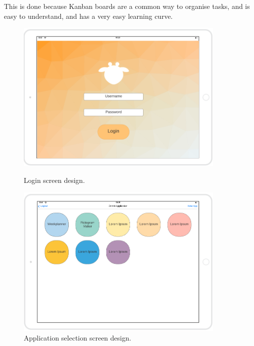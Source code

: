 This is done because Kanban boards are a common way to organise tasks, and is easy to understand, and has a very easy learning curve. \cite{kanbanBoard}

\begin{figure}[H]
    \centering
    \begin{minipage}{0.45\textwidth}
        \centering
        \includegraphics[width=0.9\textwidth]{Sprint_1/images/login_screen.png}
        \caption{Login screen design.}
        \label{login_screen_design}
    \end{minipage}\hfill
    \begin{minipage}{0.45\textwidth}
        \centering
        \includegraphics[width=0.9\textwidth]{Sprint_1/images/app_selection_screen.png}
        \caption{Application selection screen design.}
        \label{app_selection_screen}
    \end{minipage}
\end{figure}


